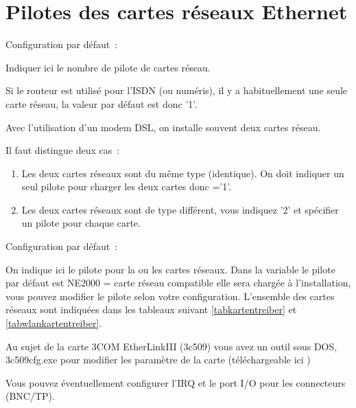 
\section{Pilotes des cartes réseaux Ethernet}

\begin{description}

    Configuration par défaut~: 

    {Indiquer ici le nombre de pilote de cartes réseau.

    Si le routeur est utilisé pour l'ISDN (ou numéris), il y a habituellement
    une seule carte réseau, la valeur par défaut est donc '1'.

    Avec l'utilisation d'un modem DSL, on installe souvent deux cartes réseau.

    Il faut distingue deux cas~:
    \begin{enumerate}
    \item Les deux cartes réseaux sont du même type (identique). On doit
      indiquer un seul pilote pour charger les deux cartes donc
      ='1'.
    \item Les deux cartes réseaux sont de type différent, vous indiquez
      '2' et spécifier un pilote pour chaque carte.
    \end{enumerate}
    }


    Configuration par défaut~: 

    {On indique ici le pilote pour la ou les cartes réseaux. Dans la variable
     le pilote par défaut est NE2000 = carte réseau compatible
	elle sera chargée à l'installation, vous pouvez modifier le pilote selon votre
	configuration. L'ensemble des cartes réseaux sont indiquées dans les tableaux suivant
	\ref{tabkartentreiber} et \ref{tabwlankartentreiber}.

    Au sujet de la carte 3COM EtherLinkIII (3c509) vous avez un outil sous DOS, 3c509cfg.exe
    pour modifier les paramètre de la carte (téléchargeable ici
    )

    Vous pouvez éventuellement configurer l'IRQ et le port I/O pour les
    connecteurs (BNC/TP).}



\end{description}
